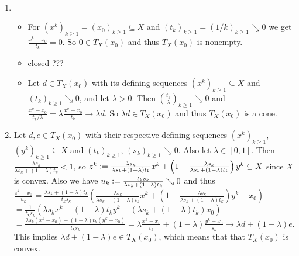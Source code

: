 \begin{solution}
    ~
    \begin{enumerate}
        \item \begin{itemize}
            \item For \((x^k)_{k \ge 1} = (x_0)_{k \ge 1} \subseteq X\) and \((t_k)_{k \ge 1} = (1/k)_{k \ge 1} \searrow 0\) we get \(\frac{x^k - x_0}{t_k} = 0\). So \(0 \in T_X(x_0)\) and thus \(T_X(x_0)\) is nonempty.
            \item closed ???
            \item Let \(d \in T_X(x_0)\) with its defining sequences \((x^k)_{k \ge 1} \subseteq X\) and \((t_k)_{k \ge 1} \searrow 0\), and let \(\lambda > 0\). Then \((\frac{t_k}{\lambda})_{k \ge 1} \searrow 0\) and \(\frac{x^k - x_0}{t_k / \lambda} = \lambda \frac{x^k - x_0}{t_k} \to \lambda d\). So \(\lambda d \in T_X(x_0)\) and thus \(T_X(x_0)\) is a cone.
        \end{itemize}

        \item Let \(d, e \in T_X(x_0)\) with their respective defining sequences \((x^k)_{k \ge 1}\), \((y^k)_{k \ge 1} \subseteq X\) and \((t_k)_{k \ge 1}\), \((s_k)_{k \ge 1} \searrow 0\). Also let \(\lambda \in [0, 1]\). Then \(\frac{\lambda s_k}{\lambda s_k + (1-\lambda) t_k} < 1\), so \(z^k \mathrel{\mathop:}= \frac{\lambda s_k}{\lambda s_k + (1-\lambda) t_k} x^k + \left(1-\frac{\lambda s_k}{\lambda s_k + (1-\lambda) t_k}\right) y^k \subseteq X\) since \(X\) is convex. Also we have \(u_k \mathrel{\mathop:}= \frac{t_k s_k}{\lambda s_k + (1-\lambda) t_k} \searrow 0\) and thus \(\frac{z^k - x_0}{u_k} = \frac{\lambda s_k + (1-\lambda) t_k}{t_k s_k} \left( \frac{\lambda s_k}{\lambda s_k + (1-\lambda) t_k} x^k + \left(1-\frac{\lambda s_k}{\lambda s_k + (1-\lambda) t_k}\right) y^k - x_0 \right)\) \\
        \(= \frac{1}{t_k s_k} \left( \lambda s_k x^k + (1-\lambda) t_k y^k - \left( \lambda s_k + (1-\lambda) t_k \right) x_0 \right)\) \\
        \(= \frac{\lambda s_k (x^k - x_0) + (1-\lambda) t_k (y^k - x_0)}{t_k s_k} = \lambda \frac{x^k - x_0}{t_k} + (1-\lambda) \frac{y^k - x_0}{s_k} \to \lambda d + (1-\lambda) e\). This implies \(\lambda d + (1-\lambda) e \in T_X(x_0)\), which means that that \(T_X(x_0)\) is convex.


\end{enumerate}
\end{solution}
